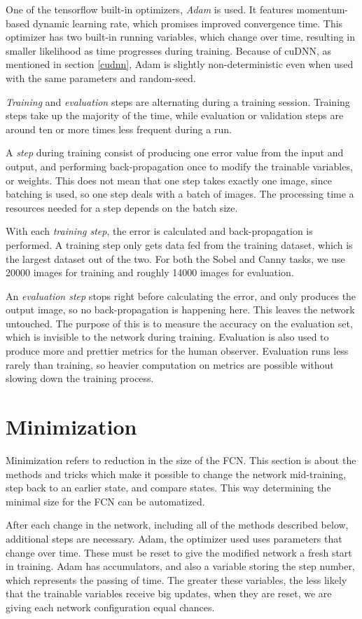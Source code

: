 \documentclass[12pt]{report}
\begin{document}
One of the tensorflow built-in optimizers, \textit{Adam} \cite{adam} is used. It features momentum-based dynamic learning rate, which promises improved convergence time. This optimizer has two built-in running variables, which change over time, resulting in smaller likelihood as time progresses during training. Because of cuDNN, as mentioned in section \ref{cudnn}, Adam is slightly non-deterministic even when used with the same parameters and random-seed.

\textit{Training} and \textit{evaluation} steps are alternating during a training session. Training steps take up the majority of the time, while evaluation or validation steps are around ten or more times less frequent during a run.

A \textit{step} during training consist of producing one error value from the input and output, and performing back-propagation once to modify the trainable variables, or weights. This does not mean that one step takes exactly one image, since batching is used, so one step deals with a batch of images. The processing time a resources needed for a step depends on the batch size.

With each \textit{training step}, the error is calculated and back-propagation is performed. A training step only gets data fed from the training dataset, which is the largest dataset out of the two. For both the Sobel and Canny tasks, we use 20000 images for training and roughly 14000 images for evaluation.

An \textit{evaluation step} stops right before calculating the error, and only produces the output image, so no back-propagation is happening here. This leaves the network untouched. The purpose of this is to measure the accuracy on the evaluation set, which is invisible to the network during training. Evaluation is also used to produce more and prettier metrics for the human observer. Evaluation runs less rarely than training, so heavier computation on metrics are possible without slowing down the training process.
\section{Minimization}
Minimization refers to reduction in the size of the FCN. This section is about the methods and tricks which make it possible to change the network mid-training, step back to an earlier state, and compare states. This way determining the minimal size for the FCN can be automatized.

After each change in the network, including all of the methods described below, additional steps are necessary. Adam, the optimizer used uses parameters that change over time. These must be reset to give the modified network a fresh start in training. Adam has accumulators, and also a variable storing the step number, which represents the passing of time. The greater these variables, the less likely that the trainable variables receive big updates, when they are reset, we are giving each network configuration equal chances.
\end{document}
